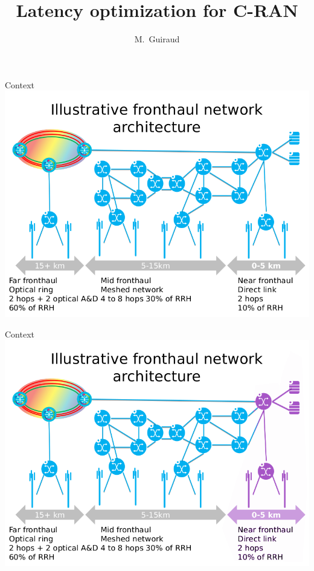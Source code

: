 \documentclass{beamer}
\title{Latency optimization for C-RAN}
\author{M.~Guiraud }
\institute[Nokia Bell Labs, UVSQ] 
{
  Nokia Bell Labs France - 
  Universit\'e de Versailles Saint Quentin\\
}
\begin{document}
\begin{frame}
  \titlepage
\end{frame}


\begin{frame}{Context}
  \centering
  \includegraphics[scale=0.38]{fronthaul0.png}
\end{frame}

\begin{frame}{Context}
  \centering
  \includegraphics[scale=0.38]{fronthaul.png}
\end{frame}
\end{document}
